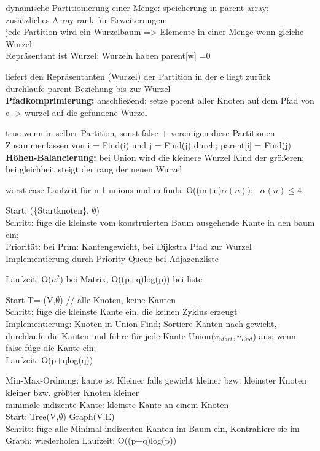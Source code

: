 dynamische Partitionierung einer Menge: speicherung in parent array; zusätzliches Array rank für Erweiterungen;\\
jede Partition wird ein Wurzelbaum => Elemente in einer Menge wenn gleiche Wurzel\\
Repräsentant ist Wurzel; Wurzeln haben parent[w] =0

liefert den Repräsentanten (Wurzel) der Partition in der e liegt zurück\\
durchlaufe parent-Beziehung bis zur Wurzel\\
\textbf{Pfadkomprimierung:} anschließend: setze parent aller Knoten auf dem Pfad von e -> wurzel auf die gefundene Wurzel

true wenn in selber Partition, sonst false + vereinigen diese Partitionen\\
Zusammenfassen von i = Find(i) und j = Find(j) durch; parent[i] = Find(j)\\
\textbf{Höhen-Balancierung:}  bei Union wird die kleinere Wurzel Kind der größeren; bei gleichheit steigt der rang der neuen Wurzel

worst-case Laufzeit für n-1 unions und m finds: O((m+n)$\alpha(n));~~~ \alpha(n) \leq 4$

Start: (\{Startknoten\}, $\emptyset$)\\
Schritt: füge die kleinste vom konstruierten Baum ausgehende Kante in den baum ein;\\
Priorität: bei Prim: Kantengewicht, bei Dijkstra Pfad zur Wurzel\\
Implementierung durch Priority Queue bei Adjazenzliste

Laufzeit: O($n^2$) bei Matrix, O((p+q)log(p)) bei liste

Start T= (V,$\emptyset$) // alle Knoten, keine Kanten\\
Schritt: füge die kleinste Kante ein, die keinen Zyklus erzeugt\\
Implementierung: Knoten in Union-Find; Sortiere Kanten nach gewicht, durchlaufe die Kanten und führe für jede Kante Union($v_{Start},v_{End}$) aus; wenn false füge die Kante ein;\\
Laufzeit: O(p+qlog(q))

Min-Max-Ordnung: kante ist Kleiner falls gewicht kleiner bzw. kleinster Knoten kleiner bzw. größter Knoten kleiner\\
minimale indizente Kante: kleinste Kante an einem Knoten\\
Start: Tree(V,$\emptyset$) Graph(V,E)\\
Schritt: füge alle Minimal indizenten Kanten im Baum ein, Kontrahiere sie im Graph; wiederholen
Laufzeit: O((p+q)log(p))